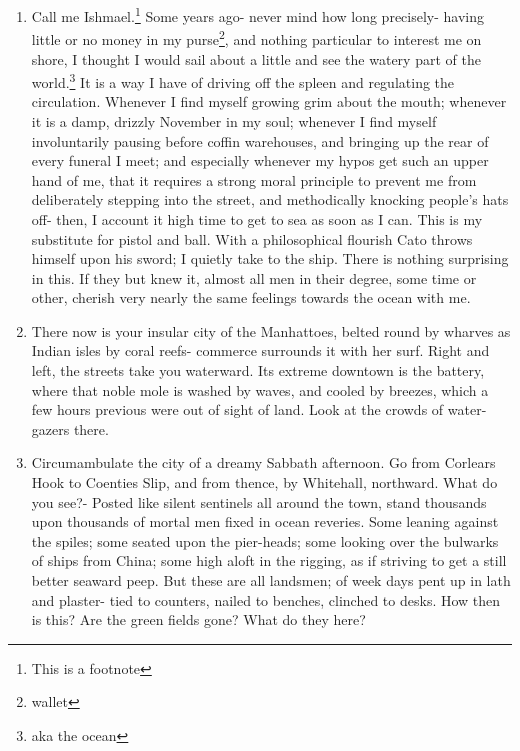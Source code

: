 \documentclass{../armymemo}
\begin{document}
\begin{enumerate}
\begin{enumerate}
  \item Call me Ishmael.\footnote{This is a footnote} Some years ago- never mind
    how long precisely- having little or no money in my purse\footnote{wallet},
    and nothing particular to interest me on shore, I thought I would sail about
    a little and see the watery part of the world.\footnote{aka the ocean} It is
    a way I have of driving off the spleen and regulating the
    circulation. Whenever I find myself growing grim about the mouth; whenever
    it is a damp, drizzly November in my soul; whenever I find myself
    involuntarily pausing before coffin warehouses, and bringing up the rear of
    every funeral I meet; and especially whenever my hypos get such an upper
    hand of me, that it requires a strong moral principle to prevent me from
    deliberately stepping into the street, and methodically knocking people's
    hats off- then, I account it high time to get to sea as soon as I can.  This
    is my substitute for pistol and ball. With a philosophical flourish Cato
    throws himself upon his sword; I quietly take to the ship. There is nothing
    surprising in this. If they but knew it, almost all men in their degree,
    some time or other, cherish very nearly the same feelings towards the ocean
    with me.

  \item There now is your insular city of the Manhattoes, belted round by wharves as
    Indian isles by coral reefs- commerce surrounds it with her surf. Right and
    left, the streets take you waterward. Its extreme downtown is the battery, where
    that noble mole is washed by waves, and cooled by breezes, which a few hours
    previous were out of sight of land. Look at the crowds of water-gazers there.

  \item Circumambulate the city of a dreamy Sabbath afternoon. Go from Corlears Hook to
    Coenties Slip, and from thence, by Whitehall, northward. What do you see?-
    Posted like silent sentinels all around the town, stand thousands upon thousands
    of mortal men fixed in ocean reveries. Some leaning against the spiles; some
    seated upon the pier-heads; some looking over the bulwarks of ships from China;
    some high aloft in the rigging, as if striving to get a still better seaward
    peep. But these are all landsmen; of week days pent up in lath and plaster- tied
    to counters, nailed to benches, clinched to desks. How then is this? Are the
    green fields gone? What do they here?


\end{enumerate}
\end{enumerate}
\end{document}
